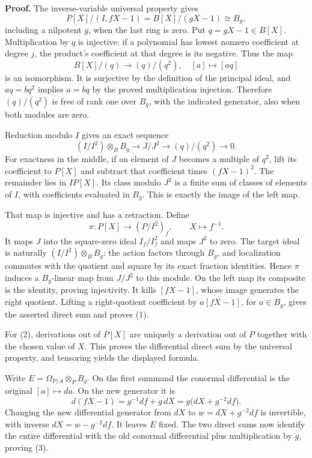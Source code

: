 \documentclass[11pt,a4paper,openany]{report}
\begin{document}
\textbf{Proof.} The inverse-variable universal property gives \[P[X]/(I,fX-1)=B[X]/(gX-1)\cong B_g,\] including a nilpotent \(g\), when the last ring is zero. Put \(q=gX-1\in B[X]\). Multiplication by \(q\) is injective: if a polynomial has lowest nonzero coefficient at degree \(j\), the product's coefficient at that degree is its negative. Thus the map \[B[X]/(q)\longrightarrow(q)/(q^2),\quad [a]\longmapsto[aq]\] is an isomorphism. It is surjective by the definition of the principal ideal, and \(aq=bq^2\) implies \(a=bq\) by the proved multiplication injection. Therefore \((q)/(q^2)\) is free of rank one over \(B_g\), with the indicated generator, also when both modules are zero.

Reduction modulo \(I\) gives an exact sequence \[ (I/I^2)\otimes_BB_g\longrightarrow J/J^2
\longrightarrow(q)/(q^2)\longrightarrow0.\] For exactness in the middle, if an element of \(J\) becomes a multiple of \(q^2\), lift its coefficient to \(P[X]\) and subtract that coefficient times \((fX-1)^2\). The remainder lies in \(IP[X]\). Its class modulo \(J^2\) is a finite sum of classes of elements of \(I\), with coefficients evaluated in \(B_g\). This is exactly the image of the left map.

That map is injective and has a retraction. Define \[\pi:P[X]\longrightarrow(P/I^2)_f,\qquad X\longmapsto f^{-1}.\] It maps \(J\) into the square-zero ideal \(I_f/I_f^2\) and maps \(J^2\) to zero. The target ideal is naturally \((I/I^2)\otimes_BB_g\): the action factors through \(B_g\), and localization commutes with the quotient and square by its exact fraction identities. Hence \(\pi\) induces a \(B_g\)-linear map from \(J/J^2\) to this module. On the left map its composite is the identity, proving injectivity. It kills \([fX-1]\), whose image generates the right quotient. Lifting a right-quotient coefficient by \(a[fX-1]\), for \(a\in B_g\), gives the asserted direct sum and proves (1).

For (2), derivations out of \(P[X]\) are uniquely a derivation out of \(P\) together with the chosen value of \(X\). This proves the differential direct sum by the universal property, and tensoring yields the displayed formula.

Write \(E=\Omega_{P/A}\otimes_PB_g\). On the first summand the conormal differential is the original \([a]\mapsto da\). On the new generator it is \[d(fX-1)=g^{-1}df+g\,dX
=g\bigl(dX+g^{-2}df\bigr).\] Changing the new differential generator from \(dX\) to \(w=dX+g^{-2}df\) is invertible, with inverse \(dX=w-g^{-2}df\). It leaves \(E\) fixed. The two direct sums now identify the entire differential with the old conormal differential plus multiplication by \(g\), proving (3).
\end{document}
